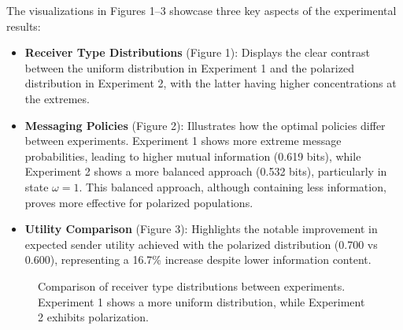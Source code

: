 \documentclass[12pt]{article}
\theoremstyle{plain}
\theoremstyle{definition}
\theoremstyle{remark}
\begin{document}
The visualizations in Figures 1--3 showcase three key aspects of the experimental results:

\begin{itemize}
    \item \textbf{Receiver Type Distributions} (Figure 1): Displays the clear contrast between the uniform distribution in Experiment 1 and the polarized distribution in Experiment 2, with the latter having higher concentrations at the extremes.
    
    \item \textbf{Messaging Policies} (Figure 2): Illustrates how the optimal policies differ between experiments. Experiment 1 shows more extreme message probabilities, leading to higher mutual information (0.619 bits), while Experiment 2 shows a more balanced approach (0.532 bits), particularly in state $\omega=1$. This balanced approach, although containing less information, proves more effective for polarized populations.
    
    \item \textbf{Utility Comparison} (Figure 3): Highlights the notable improvement in expected sender utility achieved with the polarized distribution (0.700 vs 0.600), representing a 16.7\% increase despite lower information content.
\end{itemize}

\begin{figure}[htbp]
\centering
{}
\caption{Comparison of receiver type distributions between experiments. Experiment 1 shows a more uniform distribution, while Experiment 2 exhibits polarization.}
\label{fig:type-distributions}
\end{figure}
\end{document}
